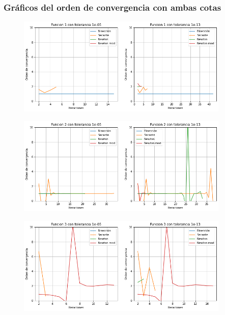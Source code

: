 \documentclass[titlepage,a4paper]{article}
\begin{document}
\subsubsection{Gráficos del orden de convergencia con ambas cotas}
\begin{figure}[H]
  \centering
    \includegraphics[width=0.9\textwidth]{converf1.png}
\end{figure}
\begin{figure}[H]
  \centering
    \includegraphics[width=0.9\textwidth]{converf2.png}
\end{figure}
\begin{figure}[H]
  \centering
    \includegraphics[width=0.9\textwidth]{converf3.png}
\end{figure}
\end{document}
